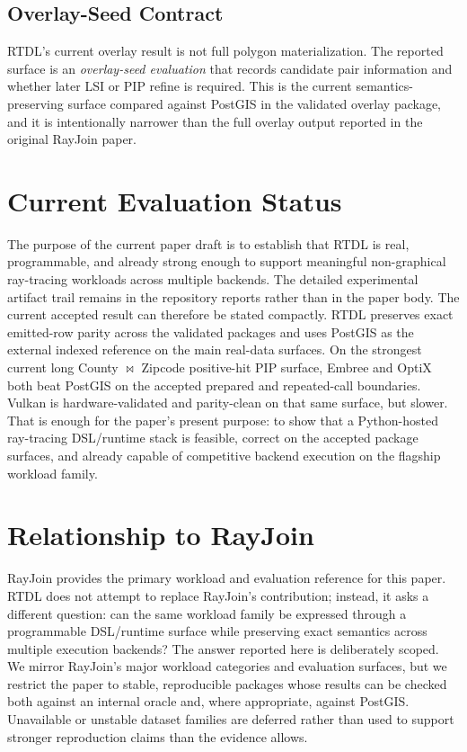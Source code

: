 \documentclass[conference]{IEEEtran}
\begin{document}
\subsection{Overlay-Seed Contract}

RTDL's current overlay result is not full polygon materialization. The reported
surface is an \emph{overlay-seed evaluation} that records candidate pair
information and whether later LSI or PIP refine is required. This is the
current semantics-preserving surface compared against PostGIS in the validated
overlay package, and it is intentionally narrower than the full overlay output
reported in the original RayJoin paper.

\section{Current Evaluation Status}

The purpose of the current paper draft is to establish that RTDL is real,
programmable, and already strong enough to support meaningful non-graphical
ray-tracing workloads across multiple backends. The detailed experimental
artifact trail remains in the repository reports rather than in the paper body.
The current accepted result can therefore be stated compactly. RTDL preserves
exact emitted-row parity across the validated packages and uses PostGIS as the
external indexed reference on the main real-data surfaces. On the strongest
current long County $\bowtie$ Zipcode positive-hit PIP surface, Embree and
OptiX both beat PostGIS on the accepted prepared and repeated-call boundaries.
Vulkan is hardware-validated and parity-clean on that same surface, but slower.
That is enough for the paper's present purpose: to show that a Python-hosted
ray-tracing DSL/runtime stack is feasible, correct on the accepted package
surfaces, and already capable of competitive backend execution on the flagship
workload family.

\section{Relationship to RayJoin}

RayJoin provides the primary workload and evaluation reference for this paper.
RTDL does not attempt to replace RayJoin's contribution; instead, it asks a
different question: can the same workload family be expressed through a
programmable DSL/runtime surface while preserving exact semantics across
multiple execution backends? The answer reported here is deliberately scoped.
We mirror RayJoin's major workload categories and evaluation surfaces, but we
restrict the paper to stable, reproducible packages whose results can be
checked both against an internal oracle and, where appropriate, against
PostGIS. Unavailable or unstable dataset families are deferred rather than used
to support stronger reproduction claims than the evidence allows.
\end{document}
